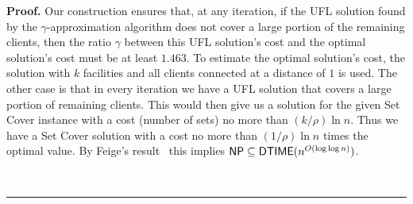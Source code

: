 \documentclass[oneside,final]{ucr}
\newenvironment{proof}[1][Proof]{\textbf{#1.} }{\ \rule{0.5em}{0.5em}}
\begin{document}
\begin{proof}
  Our construction ensures that, at any iteration, if the
  UFL solution found by the $\gamma$-approximation {\UFL}
  algorithm does not cover a large portion of the remaining
  clients, then the ratio $\gamma$ between this UFL
  solution's cost and the optimal solution's cost must be at
  least $1.463$. To estimate the optimal solution's cost,
  the solution with $k$ facilities and all clients connected
  at a distance of $1$ is used. The other case is that in
  every iteration we have a UFL solution that covers a large
  portion of remaining clients. This would then give us a
  solution for the given Set Cover instance with a cost
  (number of sets) no more than $(k/\rho) \ln n$. Thus we
  have a Set Cover solution with a cost no more than
  $(1/\rho) \ln n$ times the optimal value. By Feige's
  result~\cite{Feige98} this implies ${\mbox{\sf NP}} \subseteq
  {\mbox{\sf DTIME}}(n^{O(\log\log n)})$.


\end{proof}
\end{document}
